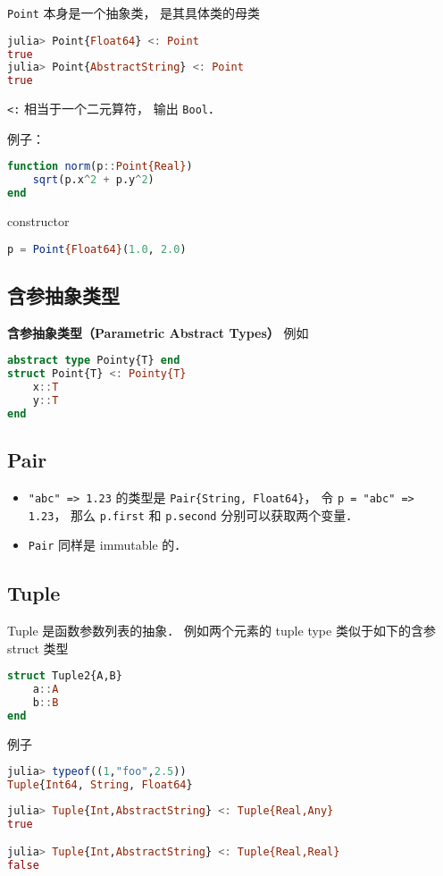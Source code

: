 \verb|Point| 本身是一个抽象类， 是其具体类的母类
\begin{lstlisting}[language=julia]
julia> Point{Float64} <: Point
true
julia> Point{AbstractString} <: Point
true
\end{lstlisting}
\verb|<:| 相当于一个二元算符， 输出 \verb|Bool|．

例子：
\begin{lstlisting}[language=julia]
function norm(p::Point{Real})
    sqrt(p.x^2 + p.y^2)
end
\end{lstlisting}
constructor
\begin{lstlisting}[language=julia]
p = Point{Float64}(1.0, 2.0)
\end{lstlisting}

\subsection{含参抽象类型}
\textbf{含参抽象类型（Parametric Abstract Types）}
例如
\begin{lstlisting}[language=julia]
abstract type Pointy{T} end
struct Point{T} <: Pointy{T}
    x::T
    y::T
end
\end{lstlisting}

\subsection{Pair}
\begin{itemize}
\item \verb|"abc" => 1.23| 的类型是 \verb|Pair{String, Float64}|， 令 \verb|p = "abc" => 1.23|， 那么 \verb|p.first| 和 \verb|p.second| 分别可以获取两个变量．
\item \verb|Pair| 同样是 immutable 的．
\end{itemize}


\subsection{Tuple}
Tuple 是函数参数列表的抽象． 例如两个元素的 tuple type 类似于如下的含参 struct 类型
\begin{lstlisting}[language=julia]
struct Tuple2{A,B}
    a::A
    b::B
end
\end{lstlisting}
例子
\begin{lstlisting}[language=julia]
julia> typeof((1,"foo",2.5))
Tuple{Int64, String, Float64}
\end{lstlisting}
\begin{lstlisting}[language=julia]
julia> Tuple{Int,AbstractString} <: Tuple{Real,Any}
true

julia> Tuple{Int,AbstractString} <: Tuple{Real,Real}
false
\end{lstlisting}

